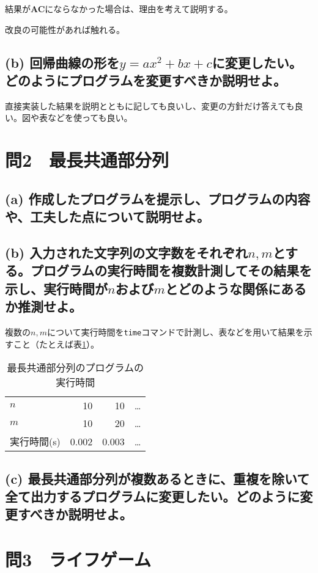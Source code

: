 \documentclass[a4j,11pt]{jarticle}
\begin{document}
結果が{\bf AC}にならなかった場合は、理由を考えて説明する。

改良の可能性があれば触れる。

\subsection*{(b) 回帰曲線の形を$y=ax^2+bx+c$に変更したい。どのようにプログラムを変更すべきか説明せよ。}
直接実装した結果を説明とともに記しても良いし、変更の方針だけ答えても良い。図や表などを使っても良い。


\section{問2　最長共通部分列}
\subsection*{(a) 作成したプログラムを提示し、プログラムの内容や、工夫した点について説明せよ。}
\subsection*{(b) 入力された文字列の文字数をそれぞれ$n,m$とする。プログラムの実行時間を複数計測してその結果を示し、実行時間が$n$および$m$とどのような関係にあるか推測せよ。}
複数の$n, m$について実行時間を{\tt time}コマンドで計測し、表などを用いて結果を示すこと（たとえば表\ref{time}）。

\begin{table}[htbp]
  \centering
  \caption{最長共通部分列のプログラムの実行時間}
  \label{time}
  \begin{tabular}{l|rrc} \hline
  $n$ & 10 & 10 & … \\
  $m$ & 10 & 20 & … \\\hline 
  実行時間(s) & 0.002 & 0.003 & … \\\hline
  \end{tabular}
\end{table}

\subsection*{(c) 最長共通部分列が複数あるときに、重複を除いて全て出力するプログラムに変更したい。どのように変更すべきか説明せよ。}


\section{問3　ライフゲーム}
\end{document}
